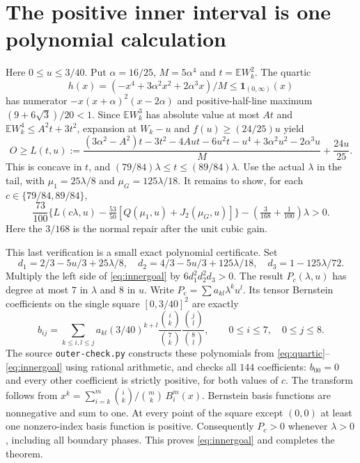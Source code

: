 \documentclass[11pt]{article}
\newcommand{\E}{\mathbb E}\newcommand{\Pp}{\mathbb P}
\begin{document}
\section{The positive inner interval is one polynomial calculation}
Here $0\le u\le3/40$. Put $\alpha=16/25$, $M=5\alpha^4$ and
$t=\E W_k^2$. The quartic
\[
 h(x)=(-x^4+3\alpha^2x^2+2\alpha^3x)/M
       \le\mathbf1_{(0,\infty)}(x)
\]
has numerator $-x(x+\alpha)^2(x-2\alpha)$ and positive-half-line
maximum $(9+6\sqrt3)/20<1$. Since $\E W_k^3$ has absolute value
at most $At$ and $\E W_k^4\le A^2t+3t^2$, expansion at $W_k-u$
and $f(u)\ge(24/25)u$ yield
\begin{equation}\label{eq:quartic}
 O\ge L(t,u):=
 \frac{(3\alpha^2-A^2)t-3t^2-4Aut-6u^2t-u^4
       +3\alpha^2u^2-2\alpha^3u}{M}+\frac{24u}{25}.
\end{equation}
This is concave in $t$, and
$(79/84)\lambda\le t\le(89/84)\lambda$.
Use the actual $\lambda$ in the tail, with
$\mu_1=25\lambda/8$ and $\mu_G=125\lambda/18$. It remains to show,
for each $c\in\{79/84,89/84\}$,
\begin{equation}\label{eq:innergoal}
 \frac{73}{100}\{L(c\lambda,u)-\tfrac{53}{50}
 [Q(\mu_1,u)+J_2(\mu_G,u)]\}
       -(\tfrac{3}{168}+\tfrac1{100})\lambda>0.
\end{equation}
Here the $3/168$ is the normal repair after the unit cubic gain.

This last verification is a small exact polynomial certificate. Set
\[
 d_1=2/3-5u/3+25\lambda/8,\quad
 d_2=4/3-5u/3+125\lambda/18,\quad d_3=1-125\lambda/72.
\]
Multiply the left side of \eqref{eq:innergoal} by
$6d_1^2d_2^2d_3>0$. The result $P_c(\lambda,u)$ has degree at
most $7$ in $\lambda$ and $8$ in $u$. Write
$P_c=\sum a_{kl}\lambda^ku^l$. Its tensor Bernstein coefficients
on the single square $[0,3/40]^2$ are exactly
\[
 b_{ij}=\sum_{k\le i,l\le j}a_{kl}(3/40)^{k+l}
       \frac{\binom ik}{\binom7k}\frac{\binom jl}{\binom8l},
 \qquad 0\le i\le7,\quad0\le j\le8.
\]
The source \texttt{outer-check.py} constructs these polynomials from
\eqref{eq:quartic}--\eqref{eq:innergoal} using rational arithmetic,
and checks all $144$ coefficients: $b_{00}=0$ and every other
coefficient is strictly positive, for both values of $c$.
The transform follows from
$x^k=\sum_{i=k}^m\binom ik/\binom mk\,B_i^m(x)$.
Bernstein basis functions are nonnegative and sum to one. At every
point of the square except $(0,0)$ at least one nonzero-index basis
function is positive. Consequently $P_c>0$ whenever $\lambda>0$,
including all boundary phases. This proves \eqref{eq:innergoal} and
completes the theorem.
\end{document}
